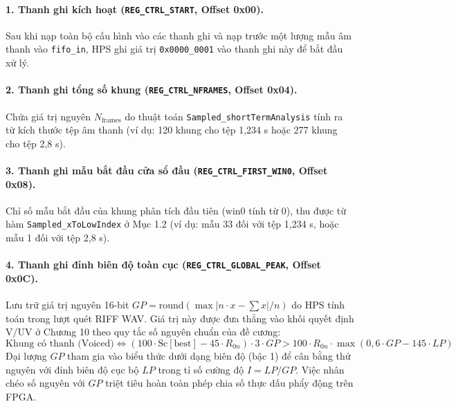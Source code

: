 \paragraph{1. Thanh ghi kích hoạt (\texttt{REG\_CTRL\_START}, Offset 0x00).}
Sau khi nạp toàn bộ cấu hình vào các thanh ghi và nạp trước một lượng mẫu âm thanh vào \texttt{fifo\_in}, HPS ghi giá trị \texttt{0x0000\_0001} vào thanh ghi này để bắt đầu xử lý.

\paragraph{2. Thanh ghi tổng số khung (\texttt{REG\_CTRL\_NFRAMES}, Offset 0x04).}
Chứa giá trị nguyên $N_{\text{frames}}$ do thuật toán \texttt{Sampled\_shortTermAnalysis} tính ra từ kích thước tệp âm thanh (ví dụ: 120 khung cho tệp 1,234 s hoặc 277 khung cho tệp 2,8 s).

\paragraph{3. Thanh ghi mẫu bắt đầu cửa sổ đầu (\texttt{REG\_CTRL\_FIRST\_WIN0}, Offset 0x08).}
Chỉ số mẫu bắt đầu của khung phân tích đầu tiên ($\text{win0}$ tính từ 0), thu được từ hàm \texttt{Sampled\_xToLowIndex} ở Mục 1.2 (ví dụ: mẫu 33 đối với tệp 1,234 s, hoặc mẫu 1 đối với tệp 2,8 s).

\paragraph{4. Thanh ghi đỉnh biên độ toàn cục (\texttt{REG\_CTRL\_GLOBAL\_PEAK}, Offset 0x0C).}
Lưu trữ giá trị nguyên 16-bit $GP = \text{round}(\max |n \cdot x - \sum x| / n)$ do HPS tính toán trong lượt quét RIFF WAV. Giá trị này được đưa thẳng vào khối quyết định V/UV ở Chương 10 theo quy tắc số nguyên chuẩn của đề cương:
\begin{equation}
\text{Khung có thanh (Voiced)} \iff (100 \cdot \text{Sc}[\text{best}] - 45 \cdot R_{0n}) \cdot 3 \cdot GP > 100 \cdot R_{0n} \cdot \max(0, 6 \cdot GP - 145 \cdot LP)
\end{equation}
Đại lượng $GP$ tham gia vào biểu thức dưới dạng biên độ (bậc 1) để cân bằng thứ nguyên với đỉnh biên độ cục bộ $LP$ trong tỉ số cường độ $I = LP / GP$. Việc nhân chéo số nguyên với $GP$ triệt tiêu hoàn toàn phép chia số thực dấu phẩy động trên FPGA.


